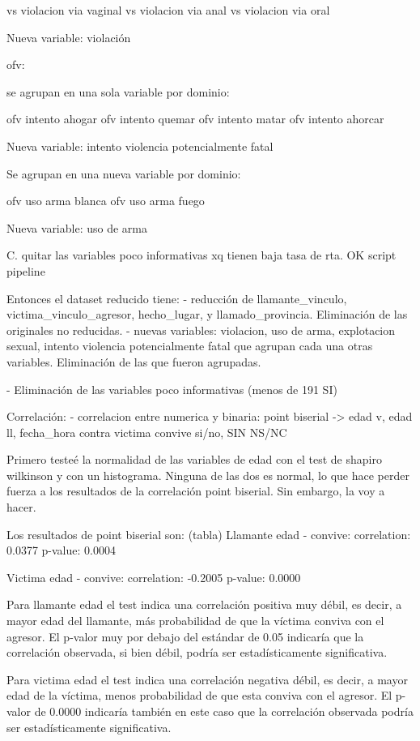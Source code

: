 \documentclass[10pt, spanish]{article}
\begin{document}
vs violacion via vaginal
vs violacion via anal
vs violacion via oral

Nueva variable: violación

ofv:

se agrupan en una sola variable por dominio:

ofv intento ahogar
ofv intento quemar 
ofv intento matar
ofv intento ahorcar

Nueva variable: intento violencia potencialmente fatal


Se agrupan en una nueva variable por dominio:

ofv uso arma blanca
ofv uso arma fuego

Nueva variable: uso de arma


C. quitar las variables poco informativas xq tienen baja tasa de rta. OK script pipeline  

Entonces el dataset reducido tiene: 
- reducción de llamante_vinculo, victima_vinculo_agresor, hecho_lugar, y llamado_provincia. Eliminación de las originales no reducidas.
- nuevas variables: violacion, uso de arma, explotacion sexual, intento violencia potencialmente fatal que agrupan cada una otras variables. Eliminación de las que fueron agrupadas.

- Eliminación de las variables poco informativas (menos de 191 SI) 

Correlación:
- correlacion entre numerica y binaria: point biserial -> edad v, edad ll, fecha_hora contra victima convive si/no, SIN NS/NC

Primero testeé la normalidad de las variables de edad con el test de shapiro wilkinson y con un histograma. Ninguna de las dos es normal, lo que hace perder fuerza a los resultados de la correlación point biserial. Sin embargo, la voy a hacer.

Los resultados de point biserial son: (tabla)
Llamante edad - convive:
correlation: 0.0377
p-value: 0.0004


Victima edad - convive:
correlation: -0.2005
p-value:  0.0000

Para llamante edad el test indica una correlación positiva muy débil, es decir, a mayor edad del llamante, más probabilidad de que la víctima conviva con el agresor. El p-valor muy por debajo del estándar de 0.05 indicaría que la correlación observada, si bien débil, podría ser estadísticamente significativa. 

Para victima edad el test indica una correlación negativa débil, es decir, a mayor edad de la víctima, menos probabilidad de que esta conviva con el agresor. El p-valor de 0.0000 indicaría también en este caso que la correlación observada podría ser estadísticamente significativa. 
\end{document}
